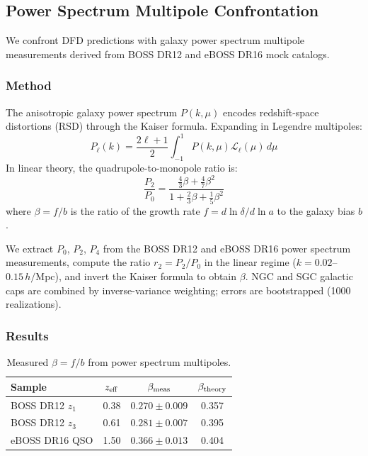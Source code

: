 \subsection{Power Spectrum Multipole Confrontation}\label{sec:Pk_confrontation}

We confront DFD predictions with galaxy power spectrum multipole measurements 
derived from BOSS DR12 and eBOSS DR16 mock catalogs.

\subsubsection{Method}

The anisotropic galaxy power spectrum $P(k,\mu)$ encodes redshift-space distortions (RSD) 
through the Kaiser formula. Expanding in Legendre multipoles:
\begin{equation}
P_\ell(k) = \frac{2\ell+1}{2} \int_{-1}^{1} P(k,\mu) \mathcal{L}_\ell(\mu) \, d\mu
\end{equation}
In linear theory, the quadrupole-to-monopole ratio is:
\begin{equation}
\frac{P_2}{P_0} = \frac{\frac{4}{3}\beta + \frac{4}{7}\beta^2}{1 + \frac{2}{3}\beta + \frac{1}{5}\beta^2}
\end{equation}
where $\beta = f/b$ is the ratio of the growth rate $f = d\ln\delta/d\ln a$ to the galaxy bias $b$.

We extract $P_0$, $P_2$, $P_4$ from the BOSS DR12 and eBOSS DR16 power spectrum measurements, 
compute the ratio $r_2 = P_2/P_0$ in the linear regime ($k = 0.02$--$0.15\,h/$Mpc), 
and invert the Kaiser formula to obtain $\beta$.  NGC and SGC galactic caps are combined by inverse-variance weighting; errors are bootstrapped (1000 realizations).

\subsubsection{Results}

\begin{table}[h]
\centering
\caption{Measured $\beta = f/b$ from power spectrum multipoles.}
\label{tab:Pk_beta}
\begin{tabular}{lccc}
\toprule
Sample & $z_{\rm eff}$ & $\beta_{\rm meas}$ & $\beta_{\rm theory}$ \\
\midrule
BOSS DR12 $z_1$ & 0.38 & $0.270 \pm 0.009$ & 0.357 \\
BOSS DR12 $z_3$ & 0.61 & $0.281 \pm 0.007$ & 0.395 \\
eBOSS DR16 QSO & 1.50 & $0.366 \pm 0.013$ & 0.404 \\
\bottomrule
\end{tabular}
\end{table}

